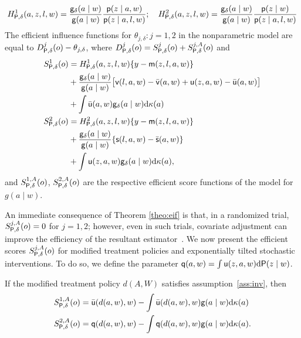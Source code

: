 \begin{theorem}\label{theo:eif}
\begin{equation}
  H^1_{\P,\delta}(a,z,l,w) = \frac{\g_\delta(a\mid
    w)}{\g(a\mid w)}\frac{\p(z\mid a,w)}{\p(z\mid a,l,w)};\quad
  H^2_{\P,\delta}(a,z,l,w) = \frac{\g_\delta(a\mid
    w)}{\g(a\mid w)}\frac{\p(z\mid w)}{\p(z\mid a,l,w)}
  \label{eq:Hs}
\end{equation}
The efficient influence functions for $\theta_{j, \delta} : j = 1, 2$ in the
nonparametric model are equal to
$D^j_{\P, \delta}(o) - \theta_{j,\delta}$, where
$D^j_{\P,\delta}(o) = S^j_{\P,\delta}(o) + S^{j,A}_{\P,\delta}(o)$ and
  \begin{align}
    S^1_{\P,\delta}(o) & =  H^1_{\P,\delta}(a,z,l,w)\{y -
             \m(z,l,a,w)\}\label{eq:scorey1}\\
                         &+ \frac{\g_\delta(a\mid
                           w)}{\g(a\mid w)}\big[\vv(l,a,w) -
                           \bar\vv(a,w)  + \uu(z,a,w)
                           -\bar\uu(a,w)\big]\label{eq:scorelz1}\\
                         &+\int \bar\uu(a,w)\g_\delta(a\mid
                           w)\dd\kappa(a)\notag\\
    S^2_{\P,\delta}(o)  & =  H^2_{\P,\delta}(a,z,l,w)\{y -
                            \m(z,l,a,w)\}\label{eq:scorey2}\\
                       & + \frac{\g_\delta(a\mid
                            w)}{\g(a\mid w)}\{\s(l,a,w) - \bar
                         \s(a,w)\}\label{eq:scorelz2}\\
                         & +\int \uu(z,a,w)\g_\delta(a\mid
                           w)\dd\kappa(a)\notag,
  \end{align}
  and $S^{1,A}_{\P,\delta}(o)$, $S^{2,A}_{\P,\delta}(o)$ are the respective
  efficient score functions of the model for $g(a\mid w)$.
\end{theorem}
An immediate consequence of Theorem \ref{theo:eif} is that, in a randomized
trial, $S^{j,A}_{\P,\delta}(o) = 0$ for $j = 1,2$; however, even in such trials,
covariate adjustment can improve the efficiency of the resultant
estimator~\citep{vdl2003unified}. We now present the efficient scores
$S^{j,A}_{\P,\delta}(o)$ for modified treatment policies and exponentially
tilted stochastic interventions. To do so, we define the parameter $\q(a,w)
= \int \uu(z, a, w)\dd\P(z\mid w)$.
\begin{lemma}\label{lemma:mtp}
  If the modified treatment policy $d(A,W)$ satisfies assumption~\ref{ass:inv},
  then
  \begin{align*}
    S^{1,A}_{\P, \delta}(o) &= \bar \uu(d(a,w), w) - \int \bar
                                \uu(d(a,w), w)\g(a\mid w)\dd\kappa(a)\\
    S^{2,A}_{\P, \delta}(o) &= \q(d(a,w), w) - \int \q(d(a,w), w)
                                \g(a \mid w) \dd\kappa(a).
  \end{align*}
\end{lemma}

